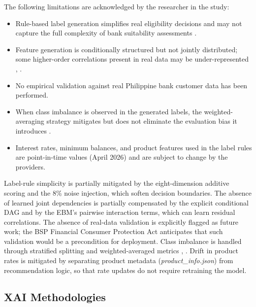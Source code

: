 \documentclass{icsthesis}
\begin{document}
\begin{mainmatter}
					The following limitations are acknowledged by the researcher in the study:

					\begin{itemize}
					    \item Rule-based label generation simplifies real eligibility decisions and may not capture the full complexity of bank suitability assessments \cite{ref46}.
					    \item Feature generation is conditionally structured but not jointly distributed; some higher-order correlations present in real data may be under-represented \cite{ref29}, \cite{ref34}.
					    \item No empirical validation against real Philippine bank customer data has been performed.
					    \item When class imbalance is observed in the generated labels, the weighted-averaging strategy mitigates but does not eliminate the evaluation bias it introduces \cite{ref58}.
					    \item Interest rates, minimum balances, and product features used in the label rules are point-in-time values (April 2026) and are subject to change by the providers.
					\end{itemize}

					Label-rule simplicity is partially mitigated by the eight-dimension additive scoring and the 8\% noise injection, which soften decision boundaries. The absence of learned joint dependencies is partially compensated by the explicit conditional DAG and by the EBM's pairwise interaction terms, which can learn residual correlations. The absence of real-data validation is explicitly flagged as future work; the BSP Financial Consumer Protection Act \cite{ref44} anticipates that such validation would be a precondition for deployment. Class imbalance is handled through stratified splitting and weighted-averaged metrics \cite{ref58}, \cite{ref78}. Drift in product rates is mitigated by separating product metadata (\emph{product\_info.json}) from recommendation logic, so that rate updates do not require retraining the model.

			\subsection{XAI Methodologies}

\end{mainmatter}
\end{document}
